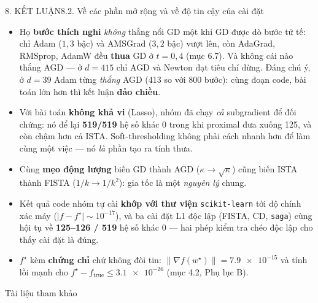 \documentclass[aspectratio=169,11pt]{beamer}
\newcommand{\wstar}{w^{\star}}
\newcommand{\norm}[1]{\lVert #1 \rVert}
\begin{document}
\begin{frame}{8. KẾT LUẬN}{8.2. Về các phần mở rộng và về độ tin cậy của cài đặt}
  \footnotesize
  \begin{itemize}\itemsep=1pt
    \item Họ \textbf{bước thích nghi} \emph{không} thắng nổi GD một khi GD được dò bước tử tế:
          chỉ Adam ($1{,}3$ bậc) và AMSGrad ($3{,}2$ bậc) vượt lên, còn AdaGrad, RMSprop, AdamW
          đều \textbf{thua} GD ở $t=0{,}4$ (mục 6.7). Và không cái nào thắng AGD --- ở $d=415$ chỉ
          AGD và Newton đạt tiêu chí dừng. Đáng chú ý, ở $d=39$ Adam từng \emph{thắng} AGD (413 so
          với 800 bước): cùng đoạn code, bài toán lớn hơn thì kết luận \textbf{đảo chiều}.
    \item Với bài toán \textbf{không khả vi} (Lasso), nhóm đã chạy \emph{cả} subgradient để đối
          chứng: nó để lại \textbf{\num{519}/\num{519}} hệ số khác 0 trong khi proximal đưa xuống
          \num{125}, và còn chậm hơn cả ISTA. Soft-thresholding không phải cách nhanh hơn để làm
          cùng một việc --- nó \emph{là} phần tạo ra tính thưa.
    \item Cùng \textbf{mẹo động lượng} biến GD thành AGD ($\kappa\to\sqrt\kappa$) cũng biến ISTA
          thành FISTA ($1/k\to1/k^2$): gia tốc là một \emph{nguyên lý} chung.
    \item Kết quả code nhóm tự cài \textbf{khớp với thư viện} \texttt{scikit-learn} tới độ chính xác
          máy ($\lvert f-f^\star\rvert\sim10^{-17}$), và ba cài đặt L1 độc lập (FISTA, CD,
          \texttt{saga}) cùng hội tụ về \textbf{125--126 / 519} hệ số khác 0 --- hai phép kiểm tra
          chéo độc lập cho thấy cài đặt là đúng.
    \item $f^\star$ kèm \textbf{chứng chỉ} chứ không đòi tin: $\norm{\nabla f(\wstar)}=\num{7.9e-15}$
          và tính lồi mạnh cho $f^\star-f_{\text{true}}\le\num{3.1e-26}$ (mục 4.2, Phụ lục B).
  \end{itemize}
\end{frame}

\begin{frame}[allowframebreaks]{Tài liệu tham khảo}
    \printbibliography[heading=none]
\end{frame}

\appendix
\end{document}
